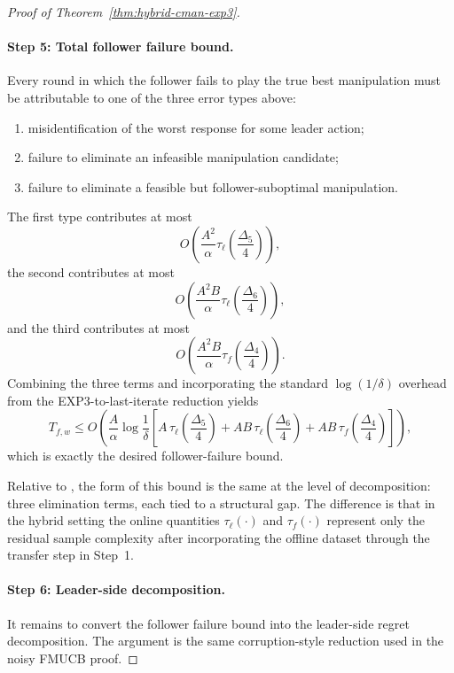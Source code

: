 \documentclass{article}
\begin{document}
\begin{proof}[Proof of Theorem~\ref{thm:hybrid-cman-exp3}]
\paragraph{Step 5: Total follower failure bound.}
Every round in which the follower fails to play the true best
manipulation must be attributable to one of the three error types
above:
\begin{enumerate}
    \item misidentification of the worst response for some leader
    action;
    \item failure to eliminate an infeasible manipulation candidate;
    \item failure to eliminate a feasible but follower-suboptimal
    manipulation.
\end{enumerate}
The first type contributes at most
\[
O\!\left(
\frac{A^2}{\alpha}\tau_\ell\!\left(\frac{\Delta_5}{4}\right)
\right),
\]
the second contributes at most
\[
O\!\left(
\frac{A^2B}{\alpha}\tau_\ell\!\left(\frac{\Delta_6}{4}\right)
\right),
\]
and the third contributes at most
\[
O\!\left(
\frac{A^2B}{\alpha}\tau_f\!\left(\frac{\Delta_4}{4}\right)
\right).
\]
Combining the three terms and incorporating the standard
$\log(1/\delta)$ overhead from the EXP3-to-last-iterate reduction
yields
\[
T_{f,w}
\le
O\!\left(
\frac{A}{\alpha}\log\frac1\delta
\left[
A\,\tau_\ell\!\left(\frac{\Delta_5}{4}\right)
+
AB\,\tau_\ell\!\left(\frac{\Delta_6}{4}\right)
+
AB\,\tau_f\!\left(\frac{\Delta_4}{4}\right)
\right]
\right),
\]
which is exactly the desired follower-failure bound.

Relative to \cite{yu2024decentralized}, the form of this bound is the
same at the level of decomposition: three elimination terms, each tied
to a structural gap. The difference is that in the hybrid setting the
online quantities $\tau_\ell(\cdot)$ and $\tau_f(\cdot)$ represent
only the residual sample complexity after incorporating the offline
dataset through the transfer step in Step~1.

\paragraph{Step 6: Leader-side decomposition.}
It remains to convert the follower failure bound into the leader-side
regret decomposition. The argument is the same corruption-style
reduction used in the noisy FMUCB proof.


\end{proof}
\end{document}
